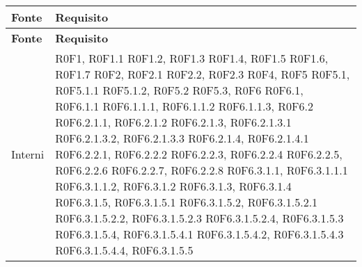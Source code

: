 \def\arraystretch{1.5}
\begin{longtable}{p{2.5cm}!{\VRule[1pt]}p{5.5cm}}
\color{white} \textbf{Fonte} & \color{white} \textbf{Requisito} \\ 
\endfirsthead 
{} 
\color{white} \textbf{Fonte} & \color{white} \textbf{Requisito} \\ 
\endhead 
Interni & R0F1, R0F1.1 \newline
R0F1.2, R0F1.3 \newline
R0F1.4, R0F1.5 \newline
R0F1.6, R0F1.7 \newline
R0F2, R0F2.1 \newline
R0F2.2, R0F2.3 \newline
R0F4, R0F5 \newline
R0F5.1, R0F5.1.1 \newline
R0F5.1.2, R0F5.2 \newline
R0F5.3, R0F6 \newline
R0F6.1, R0F6.1.1 \newline
R0F6.1.1.1, R0F6.1.1.2 \newline
R0F6.1.1.3, R0F6.2 \newline
R0F6.2.1.1, R0F6.2.1.2 \newline
R0F6.2.1.3, R0F6.2.1.3.1 \newline
R0F6.2.1.3.2, R0F6.2.1.3.3 \newline
R0F6.2.1.4, R0F6.2.1.4.1 \newline
R0F6.2.2.1, R0F6.2.2.2 \newline
R0F6.2.2.3, R0F6.2.2.4 \newline
R0F6.2.2.5, R0F6.2.2.6 \newline
R0F6.2.2.7, R0F6.2.2.8 \newline
R0F6.3.1.1, R0F6.3.1.1.1 \newline
R0F6.3.1.1.2, R0F6.3.1.2 \newline
R0F6.3.1.3, R0F6.3.1.4 \newline
R0F6.3.1.5, R0F6.3.1.5.1 \newline
R0F6.3.1.5.2, R0F6.3.1.5.2.1 \newline
R0F6.3.1.5.2.2, R0F6.3.1.5.2.3 \newline
R0F6.3.1.5.2.4, R0F6.3.1.5.3 \newline
R0F6.3.1.5.4, R0F6.3.1.5.4.1 \newline
R0F6.3.1.5.4.2, R0F6.3.1.5.4.3 \newline
R0F6.3.1.5.4.4, R0F6.3.1.5.5 \newline

\end{longtable}
